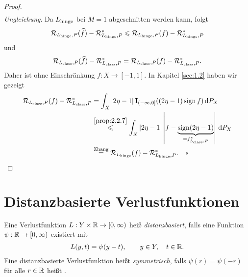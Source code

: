 \begin{proof}
\begin{align*}
\end{align*}
\textit{Ungleichung}. Da $L_{\mathrm{hinge}}$ bei $M=1$ abgeschnitten werden kann, folgt
\begin{align*}
\RR_{L_\hinge,P}(\cut{f}) - \RR_{L_\hinge,P}^* \le
\RR_{L_\hinge,P}(f)-\RR_{L_\hinge,P}^*
\end{align*}
und
\begin{align*}
\RR_{L_\class,P}(\cut{f})-\RR_{L_\class,P}^* =
\RR_{L_\class,P}(f) - \RR_{L_\class,P}^*. 
\end{align*}
Daher ist ohne Einschränkung $f: X\to [-1,1]$. In Kapitel \ref{sec:1.2} haben
wir gezeigt
\begin{align*}
\mathcal{R}_{L_{\mathrm{class}},P}(f) - \mathcal{R}_{L_{\mathrm{class}},P}^* &= \int_X
\left|2\eta-1\right|\mathbf{I}_{(-\infty,0]}((2\eta-1)\operatorname{sign} f) \,\mathrm{d} P_X\\
&\overset{\ref{prop:2.2.7}}{\leqslant}
\int_X
\left|2\eta-1\right|\left|f-\underbrace{\operatorname{sign}(2\eta-1)}_{=f_{L_{\mathrm{class}},P}^*}\right|\,\mathrm{d} P_X\\
&\overset{\text{Zhang}}{=} \mathcal{R}_{L_{\mathrm{hinge}}}(f)-\mathcal{R}_{L_{\mathrm{hinge}},P}^*.\quad\text{<<}
\end{align*}
\end{proof}

\section{Distanzbasierte Verlustfunktionen}

\begin{defn}
\label{defn:2.3.1}
Eine Verlustfunktion $L: Y \times \mathbb{R}\to[0,\infty)$ heiß
\emph{distanzbasiert}, falls eine Funktion
$\psi: \mathbb{R}\to[0,\infty)$ existiert mit
\begin{align*}
L(y,t) = \psi(y-t),\qquad y\in Y,\quad t\in\mathbb{R}.
\end{align*}
Eine distanzbasierte Verlustfunktion heißt \emph{symmetrisch}, falls $\psi(r) =
\psi(-r)$ für alle $r\in\mathbb{R}$ heißt .\fishhere
\end{defn}

